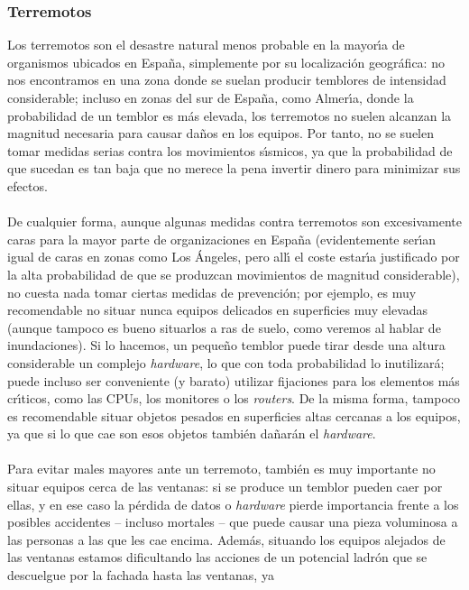 \subsubsection{Terremotos}
Los terremotos son el desastre natural menos probable en la mayor\'{\i}a de 
organismos ubicados en Espa\~na,
simplemente por su localizaci\'on geogr\'afica: no nos encontramos en una zona
donde se suelan producir temblores de intensidad considerable; incluso en zonas
del sur de Espa\~na, como Almer\'{\i}a, donde la probabilidad de un temblor es
m\'as elevada, los terremotos no suelen alcanzan la magnitud necesaria para 
causar da\~nos en los equipos. Por tanto, no se suelen tomar medidas serias 
contra los movimientos s\'{\i}smicos, ya que la probabilidad de que sucedan
es tan baja que no merece la pena invertir dinero para minimizar sus efectos.\\
\\De cualquier forma, aunque algunas medidas contra terremotos son excesivamente
caras para la mayor parte de organizaciones en Espa\~na (evidentemente 
ser\'{\i}an igual
de caras en zonas como Los \'Angeles, pero all\'{\i} el coste estar\'{\i}a 
justificado por la alta probabilidad de que se produzcan movimientos de magnitud
considerable), no cuesta nada tomar ciertas medidas de prevenci\'on; por 
ejemplo, es muy recomendable no situar nunca equipos delicados en superficies
muy elevadas (aunque tampoco es bueno situarlos a ras de suelo, como veremos 
al hablar de inundaciones). Si lo hacemos, un peque\~no temblor puede tirar
desde una altura considerable un complejo {\it hardware}, lo que con toda 
probabilidad lo inutilizar\'a; puede incluso ser conveniente (y barato) utilizar
fijaciones para los elementos m\'as cr\'{\i}ticos, como las CPUs, los monitores
o los {\it routers}. De la misma forma, tampoco es recomendable situar
objetos pesados en superficies altas cercanas a los equipos, ya que si lo que
cae son esos objetos tambi\'en da\~nar\'an el {\it hardware}.\\
\\Para evitar males mayores ante un terremoto, tambi\'en es muy importante 
no situar equipos cerca de las ventanas: si se produce un temblor pueden
caer por ellas, y en ese caso la p\'erdida de datos o {\it hardware} pierde
importancia frente a los posibles accidentes -- incluso mortales -- que puede
causar una pieza voluminosa a las personas a las que les cae encima. Adem\'as,
situando los equipos alejados de las ventanas estamos dificultando las acciones
de un potencial ladr\'on que se descuelgue por la fachada hasta las ventanas, ya
